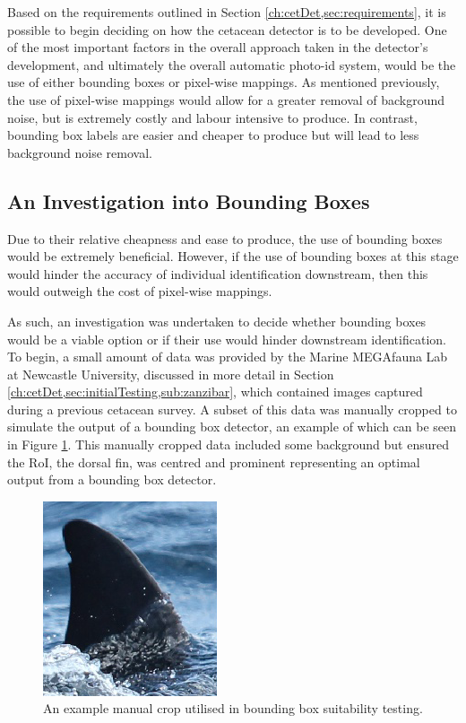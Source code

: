 Based on the requirements outlined in Section \ref{ch:cetDet,sec:requirements}, it is possible to begin deciding on how the cetacean detector is to be developed. One of the most important factors in the overall approach taken in the detector's development, and ultimately the overall automatic photo-id system, would be the use of either bounding boxes or pixel-wise mappings. As mentioned previously, the use of pixel-wise mappings would allow for a greater removal of background noise, but is extremely costly and labour intensive to produce. In contrast, bounding box labels are easier and cheaper to produce but will lead to less background noise removal. 

\subsection{An Investigation into Bounding Boxes}\label{ch:cetDet,sec:deciding,sub:boundingBoxInvestigation}

Due to their relative cheapness and ease to produce, the use of bounding boxes would be extremely beneficial. However, if the use of bounding boxes at this stage would hinder the accuracy of individual identification downstream, then this would outweigh the cost of pixel-wise mappings. 

As such, an investigation was undertaken to decide whether bounding boxes would be a viable option or if their use would hinder downstream identification. To begin, a small amount of data was provided by the Marine MEGAfauna Lab at Newcastle University, discussed in more detail in Section \ref{ch:cetDet,sec:initialTesting,sub:zanzibar}, which contained images captured during a previous cetacean survey. A subset of this data was manually cropped to simulate the output of a bounding box detector, an example of which can be seen in Figure \ref{fig:manual-crop-example}. This manually cropped data included some background but ensured the RoI, the dorsal fin, was centred and prominent representing an optimal output from a bounding box detector. 

\begin{figure}
	\begin{center}
		\includegraphics[scale=0.6]{Chapter3/figs/manual-crop-example.png}
	\end{center}
	\caption{An example manual crop utilised in bounding box suitability testing.
	}
	\label{fig:manual-crop-example}
\end{figure}

